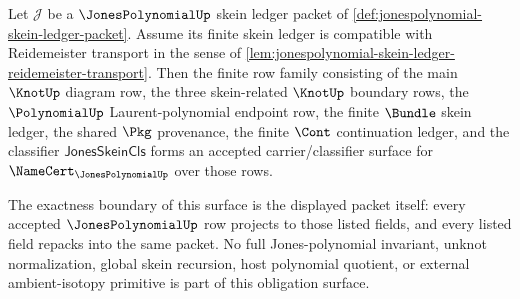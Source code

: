 \begin{theorem}
\label{thm:jonespolynomial-skein-ledger-obligation-surface}
Let $\mathcal{J}$ be a $\JonesPolynomialUp$ skein ledger packet of
\autoref{def:jonespolynomial-skein-ledger-packet}. Assume its finite skein
ledger is compatible with Reidemeister transport in the sense of
\autoref{lem:jonespolynomial-skein-ledger-reidemeister-transport}. Then the
finite row family consisting of the main $\KnotUp$ diagram row, the three
skein-related $\KnotUp$ boundary rows, the $\PolynomialUp$ Laurent-polynomial
endpoint row, the finite $\Bundle$ skein ledger, the shared $\Pkg$ provenance,
the finite $\Cont$ continuation ledger, and the classifier
$\mathsf{JonesSkeinCls}$ forms an accepted carrier/classifier surface for
$\NameCert_{\JonesPolynomialUp}$ over those rows.

The exactness boundary of this surface is the displayed packet itself: every
accepted $\JonesPolynomialUp$ row projects to those listed fields, and every
listed field repacks into the same packet. No full Jones-polynomial invariant,
unknot normalization, global skein recursion, host polynomial quotient, or
external ambient-isotopy primitive is part of this obligation surface.
\end{theorem}
